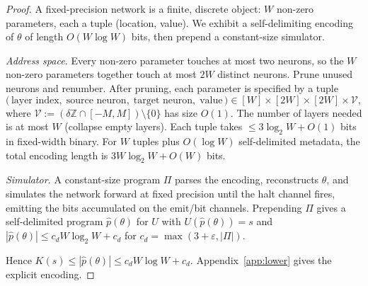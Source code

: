 \documentclass[10pt,a4paper]{amsart}
\newcommand{\Z}{\mathbb{Z}}
\newcommand{\eps}{\varepsilon}
\begin{document}
\begin{proof}[Proof]
  A fixed-precision network is a finite, discrete object: $W$ non-zero parameters, each a tuple (location, value). We exhibit a self-delimiting encoding of $\theta$ of length $O(W \log W)$ bits, then prepend a constant-size simulator.

  \emph{Address space.} Every non-zero parameter touches at most two neurons, so the $W$ non-zero parameters together touch at most $2W$ distinct neurons. Prune unused neurons and renumber. After pruning, each parameter is specified by a tuple
  \[
    \bigl(\,\text{layer index},\; \text{source neuron},\; \text{target neuron},\; \text{value}\,\bigr) \in [W] \times [2W] \times [2W] \times \mathcal{V},
  \]
  where $\mathcal{V} := (\delta\Z \cap [-M, M]) \setminus \{0\}$ has size $O(1)$.
  The number of layers needed is at most $W$ (collapse empty layers). Each tuple
  takes $\le 3 \log_2 W + O(1)$ bits in fixed-width binary. For $W$ tuples plus
  $O(\log W)$ self-delimited metadata, the total encoding length is $3 W \log_2 W
    + O(W)$ bits.

  \emph{Simulator.} A constant-size program $\Pi$ parses the encoding, reconstructs $\theta$, and simulates the network forward at fixed precision until the halt channel fires, emitting the bits accumulated on the emit/bit channels. Prepending $\Pi$ gives a self-delimited program $\hat p(\theta)$ for $U$ with $U(\hat p(\theta)) = s$ and $|\hat p(\theta)| \le c_d W \log_2 W + c_d$ for $c_d = \max(3 + \eps, |\Pi|)$.

  Hence $K(s) \le |\hat p(\theta)| \le c_d W \log W + c_d$.
  Appendix~\ref{app:lower} gives the explicit encoding.
\end{proof}
\end{document}
